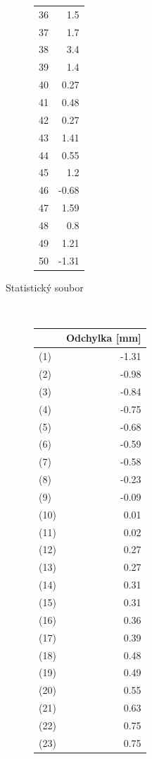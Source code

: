 \documentclass[11pt,titlepage]{article}
\begin{document}
\begin{figure}[htbp]
\begin{subfigure}[t]{0.5\textwidth}
\begin{subfigure}[t]{0.5\textwidth}
\begin{center}
\begin{tabular}{rr}
36 & 1.5\\
37 & 1.7\\
38 & 3.4\\
39 & 1.4\\
40 & 0.27\\
41 & 0.48\\
42 & 0.27\\
43 & 1.41\\
44 & 0.55\\
45 & 1.2\\
46 & -0.68\\
47 & 1.59\\
48 & 0.8\\
49 & 1.21\\
50 & -1.31\\
\end{tabular}
\end{center}
\end{subfigure}\caption{Statistický soubor}\end{subfigure}~
\hfill\begin{subfigure}[t]{0.5\textwidth}\centering\begin{subfigure}[t]{0.5\textwidth}
\begin{center}
\begin{tabular}{lr}
 & Odchylka [mm]\\
\hline
(1) & -1.31\\
(2) & -0.98\\
(3) & -0.84\\
(4) & -0.75\\
(5) & -0.68\\
(6) & -0.59\\
(7) & -0.58\\
(8) & -0.23\\
(9) & -0.09\\
(10) & 0.01\\
(11) & 0.02\\
(12) & 0.27\\
(13) & 0.27\\
(14) & 0.31\\
(15) & 0.31\\
(16) & 0.36\\
(17) & 0.39\\
(18) & 0.48\\
(19) & 0.49\\
(20) & 0.55\\
(21) & 0.63\\
(22) & 0.75\\
(23) & 0.75\\

\end{tabular}
\end{center}
\end{subfigure}
\end{subfigure}
\end{figure}
\end{document}
